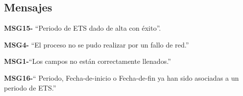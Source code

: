 \subsection{Mensajes}

\begin{Citemize}
    \item {\bf MSG15-} ``Periodo de ETS  dado de alta con éxito''.
    \item {\bf MSG4-}  ``El proceso no se pudo realizar por un fallo de red.''
    \item {\bf MSG1-}{``Los campos no están correctamente llenados.''}
    \item {\bf MSG16-}{`` Periodo, Fecha-de-inicio o Fecha-de-fin ya han sido asociadas a un periodo de ETS.''}
\end{Citemize}

